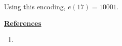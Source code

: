 \documentclass[12pt]{article}
\begin{document}
\begin{enumerate}[1.]
\begin{itemize}
\begin{itemize}
            \bigskip

            Using this encoding, $e(17) = 10001$.

        \end{itemize}
    \end{itemize}

    \bigskip

    \underline{\textbf{References}}

    \bigskip

    \begin{enumerate}[1)]
        \item
    \end{enumerate}


\end{enumerate}
\end{document}
